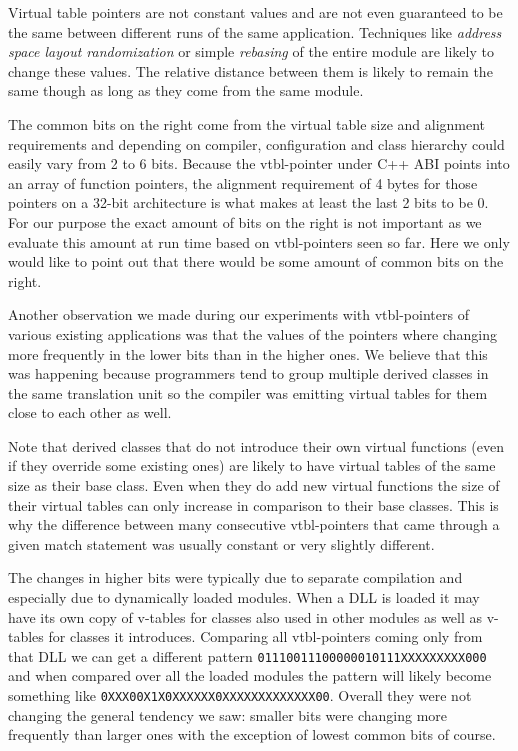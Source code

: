 \documentclass[preprint]{sigplanconf}
\begin{document}
Virtual table pointers are not constant values and are not even guaranteed to be 
the same between different runs of the same application. Techniques like 
\emph{address space layout randomization} or simple \emph{rebasing} of the entire 
module are likely to change these values. The relative distance between them is 
likely to remain the same though as long as they come from the same module.

The common bits on the right come from the virtual table size and alignment 
requirements and depending on compiler, configuration and class hierarchy could 
easily vary from 2 to 6 bits. Because the vtbl-pointer under C++ ABI points into 
an array of function pointers, the alignment requirement of 4 bytes for those 
pointers on a 32-bit architecture is what makes at least the last 2 bits to be 0. 
For our purpose the exact amount of bits on the right is not important as we 
evaluate this amount at run time based on vtbl-pointers seen so far. Here we only 
would like to point out that there would be some amount of common bits on the 
right.

Another observation we made during our experiments with vtbl-pointers of various 
existing applications was that the values of the pointers where changing more 
frequently in the lower bits than in the higher ones. We believe that this was 
happening because programmers tend to group multiple derived classes in the same 
translation unit so the compiler was emitting virtual tables for them close to 
each other as well. 

Note that derived classes that do not introduce their own virtual functions 
(even if they override some existing ones) are likely to have virtual tables of 
the same size as their base class. Even when they do add new virtual functions 
the size of their virtual tables can only increase in comparison to their base 
classes. This is why the difference between many consecutive vtbl-pointers that 
came through a given match statement was usually constant or very slightly 
different.

The changes in higher bits were typically due to separate compilation and 
especially due to dynamically loaded modules. When a DLL is loaded it may have 
its own copy of v-tables for classes also used in other modules as well as 
v-tables for classes it introduces. Comparing all vtbl-pointers coming only from 
that DLL we can get a different pattern \texttt{01110011100000010111XXXXXXXXX000} 
and when compared over all the loaded modules the pattern will likely become 
something like \texttt{0XXX00X1X0XXXXXX0XXXXXXXXXXXXX00}. Overall they were not 
changing the general tendency we saw: smaller bits were changing more frequently 
than larger ones with the exception of lowest common bits of course.
\end{document}
